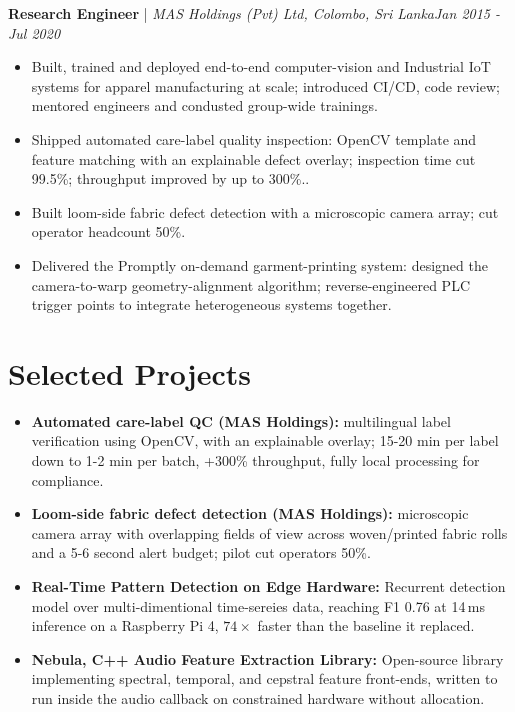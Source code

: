 \documentclass[11pt]{article}
\newenvironment{cvrole}[5]{%
  \par\noindent\textbf{\large #1} | \textit{\small #2, #3}\hfill \textit{\small #4 - #5}\par
  \begin{itemize}[leftmargin=2em, itemsep=-0.3em, topsep=-0.5em]%
}{%
  \end{itemize}\par\noindent\mbox{}\par\vspace{0.1em}%
}
\begin{document}
\begin{cvrole}{Research Engineer}{MAS Holdings (Pvt) Ltd}{Colombo, Sri Lanka}{Jan 2015}{Jul 2020}
    \item Built, trained and deployed end-to-end computer-vision and Industrial IoT systems for apparel manufacturing at scale; introduced CI/CD, code review; mentored engineers and condusted group-wide trainings.
    \item Shipped automated care-label quality inspection: OpenCV template and feature matching with an explainable defect overlay; inspection time cut 99.5\%; throughput improved by up to 300\%..
    \item Built loom-side fabric defect detection with a microscopic camera array; cut operator headcount 50\%.
    \item Delivered the Promptly on-demand garment-printing system: designed the camera-to-warp geometry-alignment algorithm; reverse-engineered PLC trigger points to integrate heterogeneous systems together.
\end{cvrole}







\section*{Selected Projects \footnotesize {}}
\begin{itemize}[leftmargin=1.2em, itemsep=-0.25em]
    \item \textbf{Automated care-label QC (MAS Holdings):} multilingual label verification using OpenCV, with an explainable overlay; 15-20 min per label down to 1-2 min per batch, +300\% throughput, fully local processing for compliance.
    \item \textbf{Loom-side fabric defect detection (MAS Holdings):} microscopic camera array with overlapping fields of view across woven/printed fabric rolls and a 5-6 second alert budget; pilot cut operators 50\%.
    \item \textbf{Real-Time Pattern Detection on Edge Hardware:} Recurrent detection model over multi-dimentional time-sereies data, reaching F1 0.76 at 14\,ms inference on a Raspberry Pi 4, $74\times$ faster than the baseline it replaced.
    \item \textbf{Nebula, C++ Audio Feature Extraction Library:} Open-source library implementing spectral, temporal, and cepstral feature front-ends, written to run inside the audio callback on constrained hardware without allocation.

\end{itemize}
\end{document}
